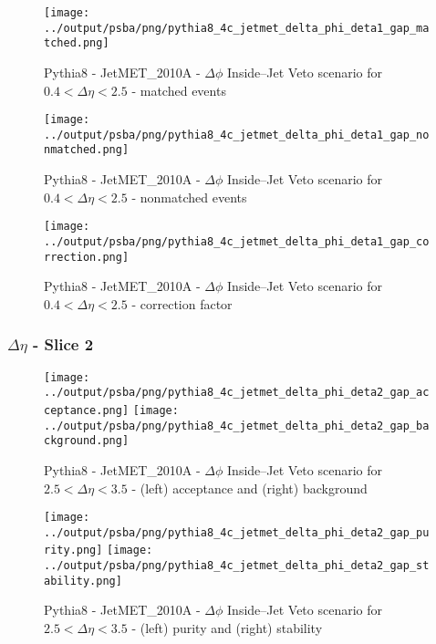 \documentclass[11pt]{book}
\begin{document}
\begin{figure}[ht]
\centering
\texttt{[image: ../output/psba/png/pythia8\_4c\_jetmet\_delta\_phi\_deta1\_gap\_matched.png]}
\caption{Pythia8 - JetMET\_2010A - $\Delta\phi$ Inside--Jet Veto scenario for $0.4 < \Delta\eta < 2.5$ - matched events}
\label{fig:p8_jetmet_delta_phi_deta1_gap_matched}
\end{figure}

\begin{figure}[ht]
\centering
\texttt{[image: ../output/psba/png/pythia8\_4c\_jetmet\_delta\_phi\_deta1\_gap\_nonmatched.png]}
\caption{Pythia8 - JetMET\_2010A - $\Delta\phi$ Inside--Jet Veto scenario for $0.4 < \Delta\eta < 2.5$ - nonmatched events}
\label{fig:p8_jetmet_delta_phi_deta1_gap_nonmatched}
\end{figure}

\begin{figure}[ht]
\centering
\texttt{[image: ../output/psba/png/pythia8\_4c\_jetmet\_delta\_phi\_deta1\_gap\_correction.png]}
\caption{Pythia8 - JetMET\_2010A - $\Delta\phi$ Inside--Jet Veto scenario for $0.4 < \Delta\eta < 2.5$ - correction factor}
\label{fig:p8_jetmet_delta_phi_deta1_gap_correction}
\end{figure}


\clearpage
\subsubsection{$\Delta\eta$ - Slice 2}
\begin{figure}[ht]
\centering
\texttt{[image: ../output/psba/png/pythia8\_4c\_jetmet\_delta\_phi\_deta2\_gap\_acceptance.png]}
\texttt{[image: ../output/psba/png/pythia8\_4c\_jetmet\_delta\_phi\_deta2\_gap\_background.png]}
\caption{Pythia8 - JetMET\_2010A - $\Delta\phi$ Inside--Jet Veto scenario for $2.5 < \Delta\eta < 3.5$ - (left) acceptance and (right) background}
\label{fig:p8_jetmet_delta_phi_deta2_gap_ab}
\end{figure}

\begin{figure}[ht]
\centering
\texttt{[image: ../output/psba/png/pythia8\_4c\_jetmet\_delta\_phi\_deta2\_gap\_purity.png]}
\texttt{[image: ../output/psba/png/pythia8\_4c\_jetmet\_delta\_phi\_deta2\_gap\_stability.png]}
\caption{Pythia8 - JetMET\_2010A - $\Delta\phi$ Inside--Jet Veto scenario for $2.5 < \Delta\eta < 3.5$ - (left) purity and (right) stability}
\label{fig:p8_jetmet_delta_phi_deta2_gap_ps}
\end{figure}
\end{document}
